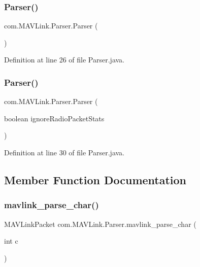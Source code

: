 \subsubsection{\texorpdfstring{Parser()}{Parser()}\hspace{0.1cm}{\footnotesize\ttfamily [1/2]}}
{\footnotesize\ttfamily com.\+M\+A\+V\+Link.\+Parser.\+Parser (\begin{DoxyParamCaption}{ }\end{DoxyParamCaption})\hspace{0.3cm}{\ttfamily [inline]}}



Definition at line 26 of file Parser.\+java.

\mbox{\label{classcom_1_1MAVLink_1_1Parser_a133de554c9c5a60a826ce503113a7928}} 
\subsubsection{\texorpdfstring{Parser()}{Parser()}\hspace{0.1cm}{\footnotesize\ttfamily [2/2]}}
{\footnotesize\ttfamily com.\+M\+A\+V\+Link.\+Parser.\+Parser (\begin{DoxyParamCaption}\item[{boolean}]{ignore\+Radio\+Packet\+Stats }\end{DoxyParamCaption})\hspace{0.3cm}{\ttfamily [inline]}}



Definition at line 30 of file Parser.\+java.



\subsection{Member Function Documentation}
\mbox{\label{classcom_1_1MAVLink_1_1Parser_a07c7cd220c75b191607adf6bed968d04}} 
\subsubsection{\texorpdfstring{mavlink\_parse\_char()}{mavlink\_parse\_char()}}
{\footnotesize\ttfamily M\+A\+V\+Link\+Packet com.\+M\+A\+V\+Link.\+Parser.\+mavlink\+\_\+parse\+\_\+char (\begin{DoxyParamCaption}\item[{int}]{c }\end{DoxyParamCaption})\hspace{0.3cm}{\ttfamily [inline]}}

